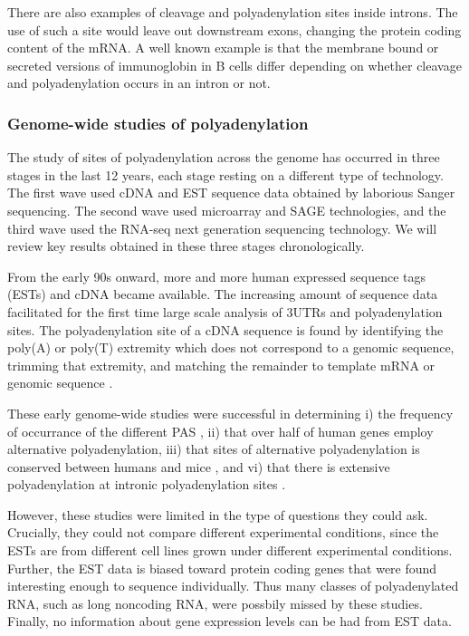 There are also examples of cleavage and polyadenylation sites inside introns.
The use of such a site would leave out downstream exons, changing the protein
coding content of the mRNA. A well known example is that the membrane bound or
secreted versions of immunoglobin in B cells differ depending on whether
cleavage and polyadenylation occurs in an intron or not.

\subsubsection{Genome-wide studies of polyadenylation}
The study of sites of polyadenylation across the genome has occurred in three
stages in the last 12 years, each stage resting on a different type of
technology. The first wave used cDNA and EST sequence data obtained by
laborious Sanger sequencing. The second wave used microarray and SAGE
technologies, and the third wave used the RNA-seq next generation sequencing
technology. We will review key results obtained in these three stages
chronologically.

From the early 90s onward, more and more human expressed sequence tags (ESTs)
and cDNA became available. The increasing amount of sequence data facilitated
for the first time large scale analysis of 3\p UTRs and polyadenylation sites.
The polyadenylation site of a cDNA sequence is found by identifying the poly(A)
or poly(T) extremity which does not correspond to a genomic sequence, trimming
that extremity, and matching the remainder to template mRNA or genomic sequence
\cite{beaudoing_patterns_2000, tian_large-scale_2005}.

These early genome-wide studies were successful in determining i) the frequency
of occurrance of the different PAS \cite{beaudoing_patterns_2000}, ii) that
over half of human genes employ alternative polyadenylation, iii) that sites of
alternative polyadenylation is conserved between humans and mice
\cite{tian_large-scale_2005}, and vi) that there is extensive polyadenylation
at intronic polyadenylation sites \cite{tian_widespread_2007}.

However, these studies were limited in the type of questions they could ask.
Crucially, they could not compare different experimental conditions, since the
ESTs are from different cell lines grown under different experimental
conditions. Further, the EST data is biased toward protein coding genes that
were found interesting enough to sequence individually. Thus many classes of
polyadenylated RNA, such as long noncoding RNA, were possbily missed by these
studies. Finally, no information about gene expression levels can be had from
EST data.

